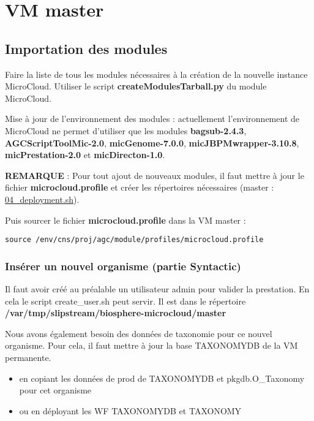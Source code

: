 \section{VM master}

\subsection{Importation des modules}
Faire la liste de tous les modules nécessaires à la création de la nouvelle instance MicroCloud.
Utiliser le script \textbf{createModulesTarball.py} du module MicroCloud.

Mise à jour de l'environnement des modules :
actuellement l'environnement de MicroCloud ne permet d'utiliser que les modules \textbf{bagsub-2.4.3}, \textbf{AGCScriptToolMic-2.0}, \textbf{micGenome-7.0.0}, \textbf{micJBPMwrapper-3.10.8}, \textbf{micPrestation-2.0} et \textbf{micDirecton-1.0}.
\newline

\begin{mycolorbox}\textbf{REMARQUE} :
	Pour tout ajout de nouveaux modules, il faut mettre à jour le fichier \textbf{microcloud.profile} et créer les répertoires nécessaires (master : \href{https://github.com/IFB-ElixirFr/biosphere-microcloud/blob/master/master/04_deployment.sh}{04\_deployment.sh}).
\end{mycolorbox}

Puis sourcer le fichier \textbf{microcloud.profile} dans la VM master :
\begin{lstlisting}[style=bash]
source /env/cns/proj/agc/module/profiles/microcloud.profile
\end{lstlisting}

\subsubsection{Insérer un nouvel organisme (partie Syntactic)}
Il faut avoir créé au préalable un utilisateur admin pour valider la prestation. En cela le script create\_user.sh peut servir. Il est dans le répertoire \textbf{/var/tmp/slipstream/biosphere-microcloud/master}

Nous avons également besoin des données de taxonomie pour ce nouvel organisme. Pour cela, il faut mettre à jour la base TAXONOMYDB de la VM permanente.
\begin{itemize}
    \item en copiant les données de prod de TAXONOMYDB et pkgdb.O\_Taxonomy pour cet organisme
    \item ou en déployant les WF TAXONOMYDB et TAXONOMY
\end{itemize}

